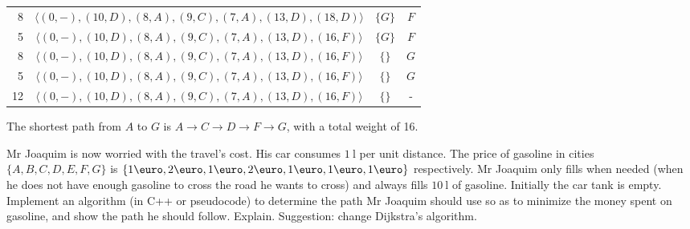 {\begin{center}
\begin{tabular}{r | c c c}
    8             & $\langle (     0, -), (    10, D), (     8, A), (     9, C), (     7, A), (    13, D), (    18, D) \rangle$ & $\{            G\}$ & $F$ \\
    5             & $\langle (     0, -), (    10, D), (     8, A), (     9, C), (     7, A), (    13, D), (    16, F) \rangle$ & $\{            G\}$ & $F$ \\
    8             & $\langle (     0, -), (    10, D), (     8, A), (     9, C), (     7, A), (    13, D), (    16, F) \rangle$ & $\{             \}$ & $G$ \\
    5             & $\langle (     0, -), (    10, D), (     8, A), (     9, C), (     7, A), (    13, D), (    16, F) \rangle$ & $\{             \}$ & $G$ \\
    12            & $\langle (     0, -), (    10, D), (     8, A), (     9, C), (     7, A), (    13, D), (    16, F) \rangle$ & $\{             \}$ & -   \\
\end{tabular} \end{center}

The shortest path from $A$ to $G$ is $A \rightarrow C \rightarrow D \rightarrow F \rightarrow G$, with a total weight of 16.

Mr Joaquim is now worried with the travel's cost. His car consumes $\SI{1}{\litre}$ per unit distance. The price of gasoline in cities $\{A,B,C,D,E,F,G\}$ is $\{1\eqeuro, 2\eqeuro, 1\eqeuro, 2\eqeuro, 1\eqeuro, 1\eqeuro, 1\eqeuro\}$ respectively. Mr Joaquim only fills when needed (when he does not have enough gasoline to cross the road he wants to cross) and always fills $\SI{10}{\litre}$ of gasoline. Initially the car tank is empty. Implement an algorithm (in C++ or pseudocode) to determine the path Mr Joaquim should use so as to minimize the money spent on gasoline, and show the path he should follow. Explain. Suggestion: change Dijkstra's algorithm.

\ansseparator

}
